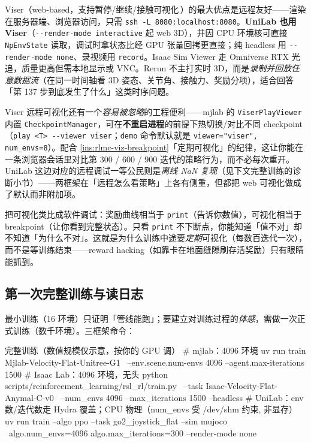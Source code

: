 Viser（web-based，支持暂停/继续/接触可视化\,\cite{mjlab2026}）的最大优点是远程友好——渲染在服务器端、浏览器访问，只需 \verb|ssh -L 8080:localhost:8080|。\textbf{UniLab 也用 Viser}（\verb|--render-mode interactive| 起 web 3D），并因 CPU 环境核可直接 \verb|NpEnvState| 读取，调试时拿状态比经 GPU 张量回拷更直接；纯 headless 用 \verb|--render-mode none|、录视频用 \verb|record|。Isaac Sim Viewer 走 Omniverse RTX 光追，质量更高但需本地显示或 VNC。Rerun 不主打实时 3D，而是\emph{录制并回放任意数据流}（在同一时间轴看 3D 姿态、关节角、接触力、奖励分项），适合回答「第 137 步到底发生了什么」这类时序问题。

\begin{insight}\label{ins:rlmc-viser-hotswap}
Viser 远程可视化还有一个\emph{容易被忽略}的工程便利——mjlab 的 \verb|ViserPlayViewer| 内置 \verb|CheckpointManager|，可在\textbf{不重启进程}的前提下热切换/对比不同 checkpoint（\verb|play <T> --viewer viser|；\verb|demo| 命令默认就是 \verb|viewer="viser", num_envs=8|）。配合 \cref{ins:rlmc-viz-breakpoint}「定期可视化」的纪律，这让你能在一条浏览器会话里对比第 300 / 600 / 900 迭代的策略行为，而不必每次重开。UniLab 这边对应的远程调试一等公民则是\emph{离线 NaN 复现}（见下文完整训练的诊断小节）——两框架在「远程怎么看策略」上各有侧重，但都把 web 可视化做成了默认而非附加项。
\end{insight}

\begin{insight}\label{ins:rlmc-viz-breakpoint}
把可视化类比成软件调试：奖励曲线相当于 \verb|print|（告诉你数值），可视化相当于 breakpoint（让你看到完整状态）。只看 \verb|print| 不下断点，你能知道「值不对」却不知道「为什么不对」。这就是为什么训练中途要\emph{定期}可视化（每数百迭代一次），而不是等训练结束——reward hacking（如靠卡在地面缝隙刷存活奖励）只有眼睛能抓到。
\end{insight}

\subsection{第一次完整训练与读日志}

最小训练（16 环境）只证明「管线能跑」；要建立对训练过程的\emph{体感}，需做一次正式训练（数千环境）。三框架命令：

\begin{codebox}[bash]{完整训练（数值规模仅示意，按你的 GPU 调）}
# mjlab：4096 环境
uv run train Mjlab-Velocity-Flat-Unitree-G1 \
    --env.scene.num-envs 4096 --agent.max-iterations 1500
# Isaac Lab：4096 环境，无头
python scripts/reinforcement_learning/rsl_rl/train.py \
    --task Isaac-Velocity-Flat-Anymal-C-v0 \
    --num_envs 4096 --max_iterations 1500 --headless
# UniLab：env 数/迭代数走 Hydra 覆盖；CPU 物理（num_envs 受 /dev/shm 约束, 非显存）
uv run train --algo ppo --task go2_joystick_flat --sim mujoco \
    algo.num_envs=4096 algo.max_iterations=300 --render-mode none
\end{codebox}


